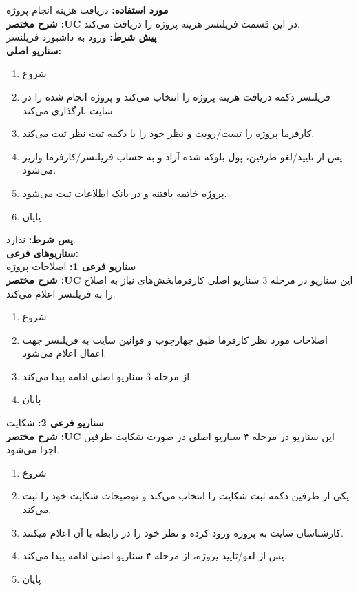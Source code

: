 \textbf{مورد استفاده:}
دریافت هزینه انجام پروژه
\\
\textbf{شرح مختصر :UC}
در این قسمت فریلنسر هزینه پروژه را دریافت می‌کند.
\\
\textbf{پيش شرط:}
ورود به داشبورد فریلنسر
\\
\textbf{سناريو اصلی:}
\begin{enumerate}
\item
شروع
\item
فریلنسر دکمه دریافت هزینه پروژه را انتخاب می‌کند و پروژه  انجام شده را در سایت بارگذاری می‌کند.
\item
کارفرما پروژه را تست/رویت و نظر خود را با دکمه ثبت نظر ثبت می‌کند.
\item
پس از تایید/لغو طرفین، پول بلوکه شده آزاد و به حساب فریلنسر/کارفرما واریز می‌شود.
\item
پروژه خاتمه یافتنه و در بانک اطلاعات ثبت می‌شود.
\item
پایان
\end{enumerate}

\noindent
\textbf{پس شرط:}
ندارد.
\\
\textbf{سناريوهای فرعی:}
\\
\textbf{سناريو فرعی 1:}
اصلاحات پروژه
\\
\textbf{شرح مختصر :UC}
این سناریو در مرحله 3 سناریو اصلی کارفرمابخش‌های نیاز به اصلاح را به فریلنسر اعلام می‌کند.
\begin{enumerate}
\item
شروع
\item
اصلاحات مورد نظر کارفرما طبق جهارچوب و قوانین سایت به فریلنسر جهت اعمال اعلام می‌شود.
\item
از مرحله 3 سناریو اصلی ادامه پیدا می‌کند.
\item
پایان
\end{enumerate}

\noindent
\textbf{سناريو فرعی 2:}
شکایت
\\
\textbf{شرح مختصر :UC}
این سناریو در مرحله ۴ سناریو اصلی در صورت شکایت طرفین اجرا می‌شود.
\begin{enumerate}
\item
شروع
\item
یکی از طرفین دکمه ثبت شکایت را انتخاب می‌کند و توضیحات شکایت خود را ثبت می‌کند.
\item
کارشناسان سایت به پروژه ورود کرده و نظر خود را در رابطه با آن اعلام میکنند.
\item
پس از لغو/تایید پروژه، از مرحله ۴ سناریو اصلی ادامه پیدا می‌کند.
\item
پایان
\end{enumerate}

